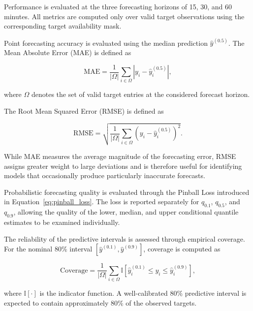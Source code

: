 Performance is evaluated at the three forecasting horizons of 15, 30, and 60 minutes. All metrics are
computed only over valid target observations using the corresponding target
availability mask.

Point forecasting accuracy is evaluated using the median prediction
$\hat{y}^{(0.5)}$. The Mean Absolute Error (MAE) is defined as

\begin{equation}
    \mathrm{MAE}
    =
    \frac{1}{|\Omega|}
    \sum_{i\in\Omega}
    \left|
        y_i-\hat{y}^{(0.5)}_i
    \right|,
    \label{eq:mae}
\end{equation}

where $\Omega$ denotes the set of valid target entries at the considered
forecast horizon.

The Root Mean Squared Error (RMSE) is defined as

\begin{equation}
    \mathrm{RMSE}
    =
    \sqrt{
        \frac{1}{|\Omega|}
        \sum_{i\in\Omega}
        \left(
            y_i-\hat{y}^{(0.5)}_i
        \right)^2
    }.
    \label{eq:rmse}
\end{equation}

While MAE measures the average magnitude of the forecasting error, RMSE
assigns greater weight to large deviations and is therefore useful for
identifying models that occasionally produce particularly inaccurate
forecasts.

Probabilistic forecasting quality is evaluated through the Pinball Loss
introduced in Equation~\ref{eq:pinball_loss}. The loss is reported
separately for $q_{0.1}$, $q_{0.5}$, and $q_{0.9}$, allowing the quality of
the lower, median, and upper conditional quantile estimates to be examined
individually.

The reliability of the predictive intervals is assessed through empirical
coverage. For the nominal 80\% interval
$[\hat{y}^{(0.1)},\hat{y}^{(0.9)}]$, coverage is computed as

\begin{equation}
    \mathrm{Coverage}
    =
    \frac{1}{|\Omega|}
    \sum_{i\in\Omega}
    \mathbb{I}
    \left[
        \hat{y}^{(0.1)}_i
        \leq y_i
        \leq
        \hat{y}^{(0.9)}_i
    \right],
    \label{eq:coverage}
\end{equation}

where $\mathbb{I}[\cdot]$ is the indicator function. A well-calibrated
80\% predictive interval is expected to contain approximately 80\% of the
observed targets.

